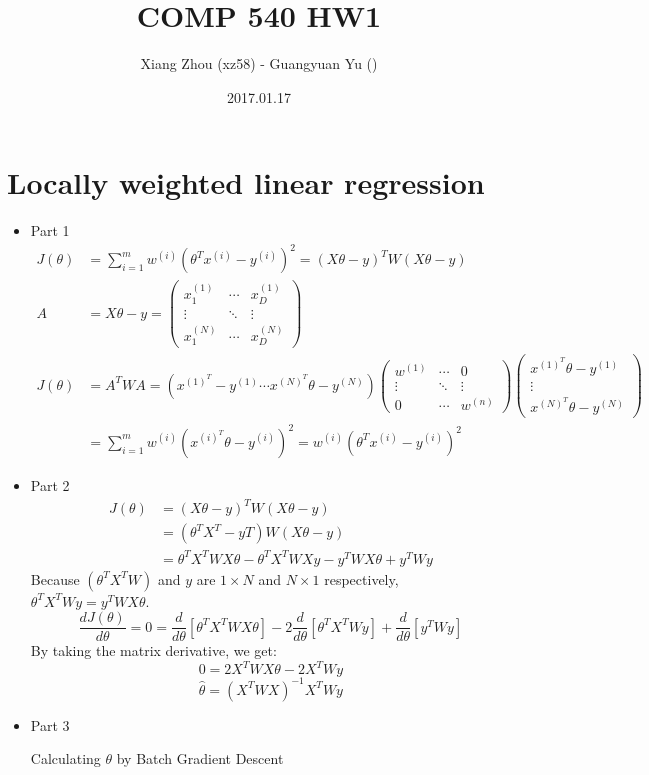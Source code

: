 \documentclass[pdftex,11pt]{article}
\begin{document}
\title{COMP 540 HW1}
\author{Xiang Zhou (xz58) - Guangyuan Yu ()}
\date{2017.01.17}
\maketitle

\section{Locally weighted linear regression}
\begin{itemize}
\item Part 1 \begin{align*}
	J(\theta)&=\sum^m_{i=1}w^{(i)}(\theta^Tx^{(i)}-y^{(i)})^2=(X\theta-y)^TW(X\theta-y)\\
	A&=X\theta-y=
	\begin{pmatrix}
		x_1^{(1)} & \cdots & x_D^{(1)}\\
		\vdots & \ddots & \vdots\\
		x_1^{(N)} & \cdots & x_D^{(N)}
	\end{pmatrix}\\
	J(\theta)&=A^TWA=(x^{(1)^T}-y^{(1)}\cdots x^{(N)^T}\theta-y^{(N)})
	\begin{pmatrix}
		w^{(1)} & \cdots & 0\\
		\vdots & \ddots & \vdots\\
		0 & \cdots & w^{(n)}
	\end{pmatrix}
	\begin{pmatrix}
		x^{(1)^T}\theta-y^{(1)}\\
		\vdots\\
		x^{(N)^T}\theta-y^{(N)}
	\end{pmatrix}\\
	&=\sum^m_{i=1}w^{(i)}(x^{(i)^T}\theta-y^{(i)})^2=w^{(i)}(\theta^Tx^{(i)}-y^{(i)})^2
	\end{align*}
\item Part 2 \begin{align*}
	J(\theta)&=(X\theta-y)^TW(X\theta-y)\\
	&=(\theta^TX^T-yT)W(X\theta-y)\\
	&=\theta^TX^TWX\theta-\theta^TX^TWXy-y^TWX\theta+y^TWy
	\end{align*}
	Because $(\theta^TX^TW)$ and $y$ are $1\times N$ and $N\times 1$ respectively, $\theta^TX^TWy=y^TWX\theta$.
	$$\frac{dJ(\theta)}{d\theta}=0=\frac{d}{d\theta}[\theta^TX^TWX\theta]-2\frac{d}{d\theta}[\theta^TX^TWy]+\frac{d}{d\theta}[y^TWy]$$
	By taking the matrix derivative, we get:
	$$0=2X^TWX\theta-2X^TWy$$
	$$\hat{\theta}=(X^TWX)^{-1}X^TWy$$
\item Part 3
\begin{algorithm}
  \caption{Calculating $\theta$ by Batch Gradient Descent}


\end{algorithm}
\end{itemize}
\end{document}
